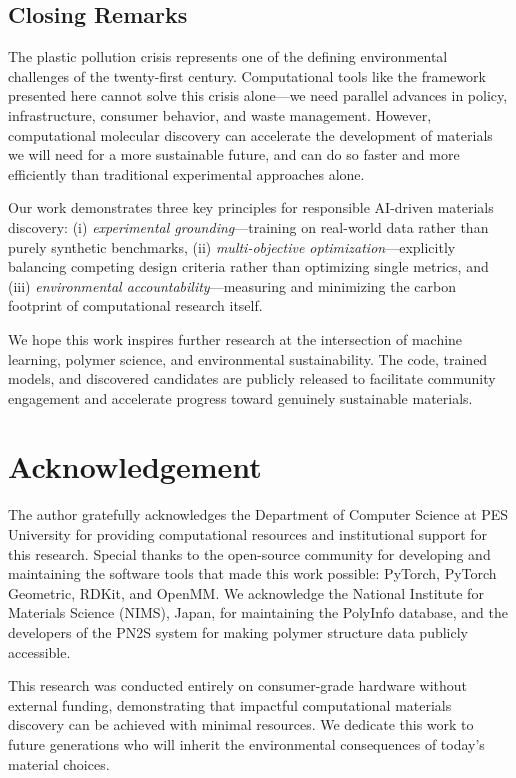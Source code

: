 \documentclass[twocolumn,10pt]{article}
\begin{document}
\subsection{Closing Remarks}

The plastic pollution crisis represents one of the defining environmental challenges of the twenty-first century. Computational tools like the framework presented here cannot solve this crisis alone—we need parallel advances in policy, infrastructure, consumer behavior, and waste management. However, computational molecular discovery can accelerate the development of materials we will need for a more sustainable future, and can do so faster and more efficiently than traditional experimental approaches alone.

Our work demonstrates three key principles for responsible AI-driven materials discovery: (i) \textit{experimental grounding}—training on real-world data rather than purely synthetic benchmarks, (ii) \textit{multi-objective optimization}—explicitly balancing competing design criteria rather than optimizing single metrics, and (iii) \textit{environmental accountability}—measuring and minimizing the carbon footprint of computational research itself.

We hope this work inspires further research at the intersection of machine learning, polymer science, and environmental sustainability. The code, trained models, and discovered candidates are publicly released to facilitate community engagement and accelerate progress toward genuinely sustainable materials.

\section*{Acknowledgement}

The author gratefully acknowledges the Department of Computer Science at PES University for providing computational resources and institutional support for this research. Special thanks to the open-source community for developing and maintaining the software tools that made this work possible: PyTorch, PyTorch Geometric, RDKit, and OpenMM. We acknowledge the National Institute for Materials Science (NIMS), Japan, for maintaining the PolyInfo database, and the developers of the PN2S system for making polymer structure data publicly accessible.

This research was conducted entirely on consumer-grade hardware without external funding, demonstrating that impactful computational materials discovery can be achieved with minimal resources. We dedicate this work to future generations who will inherit the environmental consequences of today's material choices.
\end{document}
